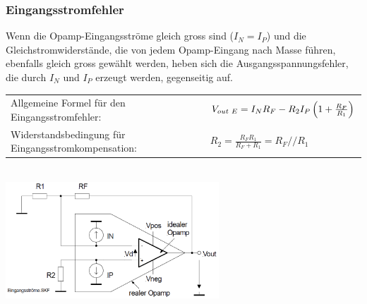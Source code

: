 		\subsubsection{Eingangsstromfehler}
			\begin{minipage}{18cm}
              Wenn die Opamp-Eingangsströme gleich gross sind
              ($I_{N}=I_{P}$) und die Gleichstromwiderstände,
              die von jedem Opamp-Eingang nach Masse führen, 
              ebenfalls gleich gross gewählt werden, heben sich die
              Ausgangsspannungsfehler, die durch $I_{N}$ und $I_{P}$
              erzeugt werden, gegenseitig auf. \\
              \begin{tabular}{ll}
              Allgemeine Formel für den
              Eingangsstromfehler: &
              $V_{out \hspace{1mm}E}=I_N R_F-R_2 I_P\left( 1+\frac{R_F}{R_1} \right)$\\
              Widerstandsbedingung für Eingangsstromkompensation:&
              $R_2=\frac{R_F R_1}{R_F+R_1}=R_F // R_1$\\
            	\end{tabular}
            \end{minipage}\\
			\includegraphics[width=8cm]{./bilder/eingangsstromfehler.png}

